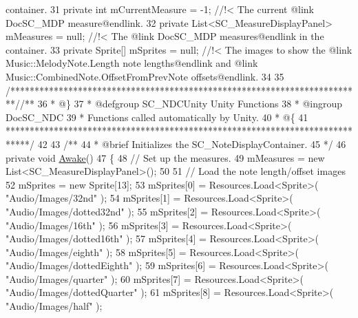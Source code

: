 \begin{DoxyCodeInclude}
{       container.}
31 \textcolor{comment}{}    \textcolor{keyword}{private} \textcolor{keywordtype}{int} mCurrentMeasure = -1; \textcolor{comment}{//!< The current @link DocSC\_MDP measure@endlink.}
32 \textcolor{comment}{}    \textcolor{keyword}{private} List<SC\_MeasureDisplayPanel> mMeasures = null; \textcolor{comment}{//!< The @link DocSC\_MDP measures@endlink in the
       container.}
33 \textcolor{comment}{}    \textcolor{keyword}{private} Sprite[] mSprites = null; \textcolor{comment}{//!< The images to show the @link Music::MelodyNote.Length note
       lengths@endlink and @link Music::CombinedNote.OffsetFromPrevNote offsets@endlink.}
34 \textcolor{comment}{}
35     \textcolor{comment}{/*************************************************************************/}\textcolor{comment}{/** }
36 \textcolor{comment}{    * @\}}
37 \textcolor{comment}{    * @defgroup SC\_NDCUnity Unity Functions}
38 \textcolor{comment}{    * @ingroup DocSC\_NDC}
39 \textcolor{comment}{    * Functions called automatically by Unity.}
40 \textcolor{comment}{    * @\{}
41 \textcolor{comment}{    *****************************************************************************/}
42 \textcolor{comment}{}
43 \textcolor{comment}{    /**}
44 \textcolor{comment}{     * @brief Initializes the SC\_NoteDisplayContainer.}
45 \textcolor{comment}{    */}
46     \textcolor{keyword}{private} \textcolor{keywordtype}{void} \hyperlink{group___s_c___n_d_c_unity_ga6ce4069508f84edd9e13d8fab4c26e09}{Awake}()
47     \{
48         \textcolor{comment}{// Set up the measures.}
49         mMeasures = \textcolor{keyword}{new} List<SC\_MeasureDisplayPanel>();
50 
51         \textcolor{comment}{// Load the note length/offset images}
52         mSprites = \textcolor{keyword}{new} Sprite[13];
53         mSprites[0] = Resources.Load<Sprite>( \textcolor{stringliteral}{"Audio/Images/32nd"} );
54         mSprites[1] = Resources.Load<Sprite>( \textcolor{stringliteral}{"Audio/Images/dotted32nd"} );
55         mSprites[2] = Resources.Load<Sprite>( \textcolor{stringliteral}{"Audio/Images/16th"} );
56         mSprites[3] = Resources.Load<Sprite>( \textcolor{stringliteral}{"Audio/Images/dotted16th"} );
57         mSprites[4] = Resources.Load<Sprite>( \textcolor{stringliteral}{"Audio/Images/eighth"} );
58         mSprites[5] = Resources.Load<Sprite>( \textcolor{stringliteral}{"Audio/Images/dottedEighth"} );
59         mSprites[6] = Resources.Load<Sprite>( \textcolor{stringliteral}{"Audio/Images/quarter"} );
60         mSprites[7] = Resources.Load<Sprite>( \textcolor{stringliteral}{"Audio/Images/dottedQuarter"} );
61         mSprites[8] = Resources.Load<Sprite>( \textcolor{stringliteral}{"Audio/Images/half"} );

\end{DoxyCodeInclude}
